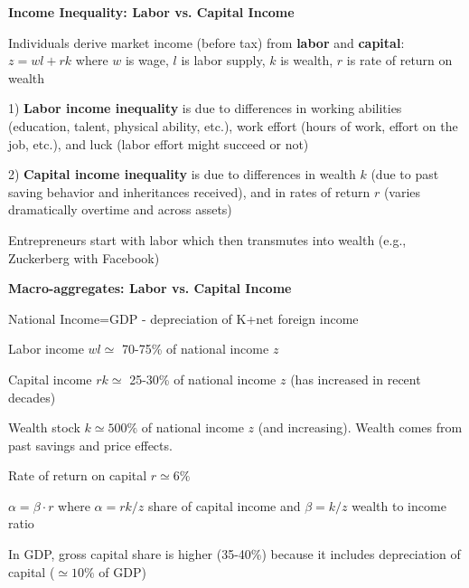 \documentclass[landscape]{slides}
\begin{document}
\begin{slide}
\begin{center}
{\bf Income Inequality: Labor vs. Capital Income}
\end{center}
Individuals derive market income (before tax) from {\bf labor} and
{\bf capital}: $z=wl+rk$ where $w$ is wage, $l$ is labor supply,
$k$ is wealth, $r$ is rate of return on wealth

1) {\bf Labor income inequality} is due to differences in working abilities
(education, talent, physical ability, etc.), work effort (hours of
work, effort on the job, etc.), and luck (labor effort might
succeed or not)

2) {\bf Capital income inequality} is due to differences in
wealth $k$ (due to past saving behavior and inheritances
received), and in rates of return $r$ (varies dramatically
overtime and across assets)

Entrepreneurs start with labor which then transmutes into
wealth (e.g., Zuckerberg with Facebook)

\end{slide}


\begin{slide}
\begin{center}
{\bf Macro-aggregates: Labor vs. Capital Income}
\end{center}
National Income=GDP - depreciation of K+net foreign income

Labor income $wl \simeq$ 70-75\% of national income $z$

Capital income $ rk \simeq$ 25-30\% of national income $z$ (has increased
in recent decades)

Wealth stock  $k \simeq 500\%$ of national income $z$ (and increasing).
Wealth comes from past savings and price effects.

Rate of return on capital $ r \simeq 6\%$

$\alpha = \beta \cdot r$ where $\alpha= r k/z$ share of capital income and
$\beta=k/z$ wealth to income ratio

In GDP, gross capital share is higher (35-40\%) because it includes
depreciation of capital ($\simeq 10\%$ of GDP)


\end{slide}

%
%
%
\end{document}
